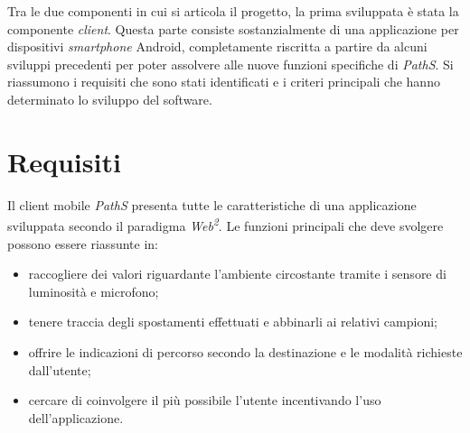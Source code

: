 Tra le due componenti in cui si articola il progetto, la prima sviluppata è stata la componente \emph{client}. Questa parte consiste sostanzialmente di una applicazione per dispositivi \emph{smartphone} Android, completamente riscritta a partire da alcuni sviluppi precedenti per poter assolvere alle nuove funzioni specifiche di \emph{PathS}. Si riassumono i requisiti che sono stati identificati e i criteri principali che hanno determinato lo sviluppo del software. 

\section{Requisiti}
Il client mobile \emph{PathS} presenta tutte le caratteristiche di una applicazione sviluppata secondo il paradigma \emph{Web\textsuperscript{2}}. 
Le funzioni principali che deve svolgere possono essere riassunte in:
\begin{itemize}
\item raccogliere dei valori riguardante l'ambiente circostante tramite i sensore di luminosità e microfono;
\item tenere traccia degli spostamenti effettuati e abbinarli ai relativi campioni;
\item offrire le indicazioni di percorso secondo la destinazione e le modalità richieste dall'utente;
\item cercare di coinvolgere il più possibile l'utente incentivando l'uso dell'applicazione.
\end{itemize}

